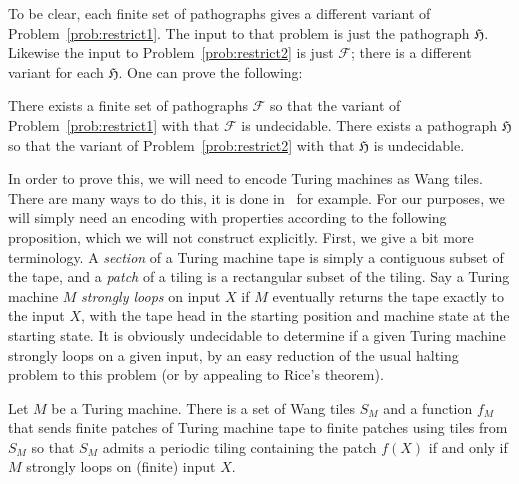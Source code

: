 \documentclass{article}
\newcommand{\Fc}{\mathcal{F}}
\newcommand{\Hf}{\mathfrak{H}}
\begin{document}
To be clear, each finite set of pathographs gives a different variant of Problem~\ref{prob:restrict1}. The input to that problem is just the pathograph $\Hf$. Likewise the input to Problem~\ref{prob:restrict2} is just $\Fc$; there is a different variant for each $\Hf$. One can prove the following:
\begin{theorem}\label{thm:restricted}
There exists a finite set of pathographs $\Fc$ so that the variant of Problem~\ref{prob:restrict1} with that $\Fc$ is undecidable. There exists a pathograph $\Hf$ so that the variant of Problem~\ref{prob:restrict2} with that $\Hf$ is undecidable.
\end{theorem}

In order to prove this, we will need to encode Turing machines as Wang tiles. There are many ways to do this, it is done in~\cite{berger} for example. For our purposes, we will simply need an encoding with properties according to the following proposition, which we will not construct explicitly. First, we give a bit more terminology. A \textit{section} of a Turing machine tape is simply a contiguous subset of the tape, and a \textit{patch} of a tiling is a rectangular subset of the tiling. Say a Turing machine $M$ \textit{strongly loops} on input $X$ if $M$ eventually returns the tape exactly to the input $X$, with the tape head in the starting position and machine state at the starting state. It is obviously undecidable to determine if a given Turing machine strongly loops on a given input, by an easy reduction of the usual halting problem to this problem (or by appealing to Rice's theorem).
\begin{proposition}\label{prop:encoding}
Let $M$ be a Turing machine. There is a set of Wang tiles $S_M$ and a function $f_M$ that sends finite patches of Turing machine tape to finite patches using tiles from $S_M$ so that $S_M$ admits a periodic tiling containing the patch $f(X)$ if and only if $M$ strongly loops on (finite) input $X$.
\end{proposition}
\end{document}
